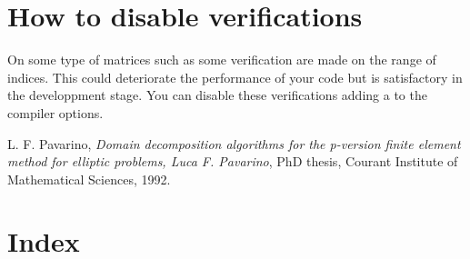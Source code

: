 \documentclass[11pt,a4paper]{article}
\begin{document}



\section{How to disable verifications}

On some type of matrices such as  some verification are made on the range of indices. This could deteriorate  the performance of your code but is satisfactory in the developpment stage. You can disable these verifications adding a  to the compiler options.


\begin{thebibliography}{99}
     L. F. {\texonly{\sc} Pavarino},
    {\it Domain decomposition algorithms for the p-version finite
         element method for elliptic problems, Luca F. Pavarino},
        PhD thesis, Courant Institute of Mathematical Sciences, 1992.
\end{thebibliography}

\section{Index}
\texorhtml{\printindex}{\label{gfmindex}\htmlprintindex}
\end{document}
